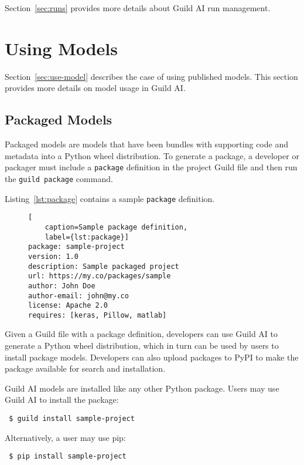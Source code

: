 \documentclass{article}
\begin{document}
Section~\ref{sec:runs} provides more details about Guild AI run
management.

\section{Using Models}

Section~\ref{sec:use-model} describes the case of using published
models. This section provides more details on model usage in Guild AI.

\subsection{Packaged Models}

Packaged models are models that have been bundles with supporting code
and metadata into a Python wheel distribution. To generate a package,
a developer or packager must include a \verb|package| definition in
the project Guild file and then run the \verb|guild package| command.

Listing~\ref{lst:package} contains a sample \verb|package| definition.

\begin{figure}
\begin{lstlisting}[
    caption=Sample package definition,
    label={lst:package}]
package: sample-project
version: 1.0
description: Sample packaged project
url: https://my.co/packages/sample
author: John Doe
author-email: john@my.co
license: Apache 2.0
requires: [keras, Pillow, matlab]
\end{lstlisting}
\end{figure}

Given a Guild file with a package definition, developers can use
Guild AI to generate a Python wheel distribution, which in turn can be
used by users to install package models. Developers can also upload
packages to PyPI to make the package available for search and
installation.

Guild AI models are installed like any other Python package. Users may
use Guild AI to install the package:

{\footnotesize
\begin{verbatim}
 $ guild install sample-project
\end{verbatim}}

Alternatively, a user may use pip:

{\footnotesize
\begin{verbatim}
 $ pip install sample-project
\end{verbatim}}
\end{document}
